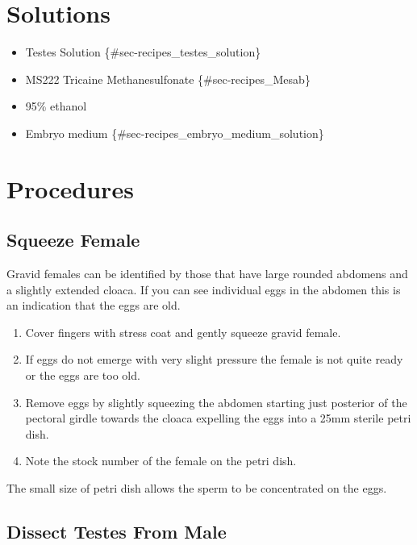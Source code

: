 \documentclass[
  letterpaper,
  DIV=11,
  numbers=noendperiod]{scrreprt}
\providecommand{\tightlist}{%
  \setlength{\itemsep}{0pt}\setlength{\parskip}{0pt}}\usepackage{longtable,booktabs,array}
\begin{document}
\hypertarget{solutions-21}{%
\section{Solutions}\label{solutions-21}}

\begin{itemize}
\tightlist
\item
  Testes Solution \{\#sec-recipes\_testes\_solution\}
\item
  MS222 Tricaine Methanesulfonate \{\#sec-recipes\_Mesab\}
\item
  95\% ethanol
\item
  Embryo medium \{\#sec-recipes\_embryo\_medium\_solution\}
\end{itemize}

\hypertarget{procedures}{%
\section{Procedures}\label{procedures}}

\hypertarget{squeeze-female}{%
\subsection{Squeeze Female}\label{squeeze-female}}

Gravid females can be identified by those that have large rounded
abdomens and a slightly extended cloaca. If you can see individual eggs
in the abdomen this is an indication that the eggs are old.

\begin{enumerate}
\def\labelenumi{\arabic{enumi}.}
\tightlist
\item
  Cover fingers with stress coat and gently squeeze gravid female.
\item
  If eggs do not emerge with very slight pressure the female is not
  quite ready or the eggs are too old.
\item
  Remove eggs by slightly squeezing the abdomen starting just posterior
  of the pectoral girdle towards the cloaca expelling the eggs into a
  25mm sterile petri dish.
\item
  Note the stock number of the female on the petri dish.
\end{enumerate}

The small size of petri dish allows the sperm to be concentrated on the
eggs.

\hypertarget{dissect-testes-from-male}{%
\subsection{Dissect Testes From Male}\label{dissect-testes-from-male}}
\end{document}
